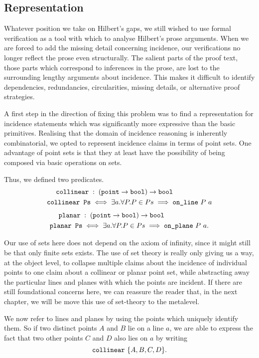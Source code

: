 \subsection{Representation}
Whatever position we take on Hilbert's gaps, we still wished to use formal verification as a tool with which to analyse Hilbert's prose arguments. When we are forced to add the missing detail concerning incidence, our verifications no longer reflect the prose even structurally. The salient parts of the proof text, those parts which correspond to inferences in the prose, are lost to the surrounding lengthy arguments about incidence. This makes it difficult to identify dependencies, redundancies, circularities, missing details, or alternative proof strategies.

A first step in the direction of fixing this problem was to find a representation for incidence statements which was significantly more expressive than the basic primitives. Realising that the domain of incidence reasoning is inherently combinatorial, we opted to represent incidence claims in terms of point sets. One advantage of point sets is that they at least have the possibility of being composed via basic operations on sets.

Thus, we defined two predicates.
\begin{align*}
\texttt{collinear}\;&:\;(\texttt{point}\rightarrow\texttt{bool})\rightarrow\texttt{bool}
\\\texttt{collinear\ Ps} &\iff \exists a. \forall P. P \in Ps \implies \texttt{on\_line}\ P\ a
\end{align*}
\begin{align*}
\texttt{planar}\;&:\;(\texttt{point}\rightarrow\texttt{bool})\rightarrow\texttt{bool}
\\\texttt{planar\ Ps} &\iff \exists a. \forall P. P \in Ps \implies \texttt{on\_plane}\ P\ a.
\end{align*}

Our use of sets here does not depend on the axiom of infinity, since it might still be that only finite sets exists. The use of set theory is really only giving us a way, at the object level, to collapse multiple claims about the incidence of individual points to one claim about a collinear or planar point set, while abstracting away the particular lines and planes with which the points are incident. If there are still foundational concerns here, we can reassure the reader that, in the next chapter, we will be move this use of set-theory to the metalevel.

We now refer to lines and planes by using the points which uniquely identify them. So if two distinct points $A$ and $B$ lie on a line $a$, we are able to express the fact that two other points $C$ and $D$ also lies on $a$ by writing 
\begin{displaymath}
\texttt{collinear}\ \{A, B, C, D\}.
\end{displaymath}

